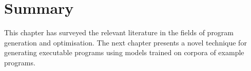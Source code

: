 \section{Summary}
\label{sec:related-work-summary}

This chapter has surveyed the relevant literature in the fields of program generation and optimisation. The next chapter presents a novel technique for generating executable programs using models trained on corpora of example programs.
